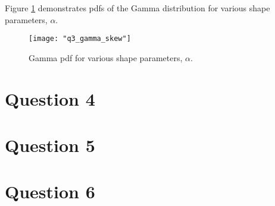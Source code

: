 \documentclass{article}[12 pt]
\begin{document}
Figure \ref{fig:q3_gamma_skew} demonstrates pdfs of the Gamma distribution for various shape parameters, $\alpha$.
\begin{center}
	\begin{figure}[H]
		\centering
		\texttt{[image: "q3\_gamma\_skew"]}
		\caption{Gamma pdf for various shape parameters, $\alpha$. }
		\label{fig:q3_gamma_skew}
	\end{figure}
\end{center}


\section*{Question 4}


\section*{Question 5}

\begin{figure}[H]%
	\centering
	\qquad
	\qquad
	\qquad
	\caption{}%
	\label{fig:q5_mle}%
\end{figure}

\begin{figure}[H]%
	\centering
	\subfloat[Nose]{{\texttt{[image: q5\_mc\_5]} }}%
	\qquad
	\subfloat[Mouth]{{\texttt{[image: q5\_mc\_10]} }}%
	\qquad
	\qquad
	\caption{}%
	\label{fig:q5_mc}%
\end{figure}


\section*{Question 6}
\end{document}
